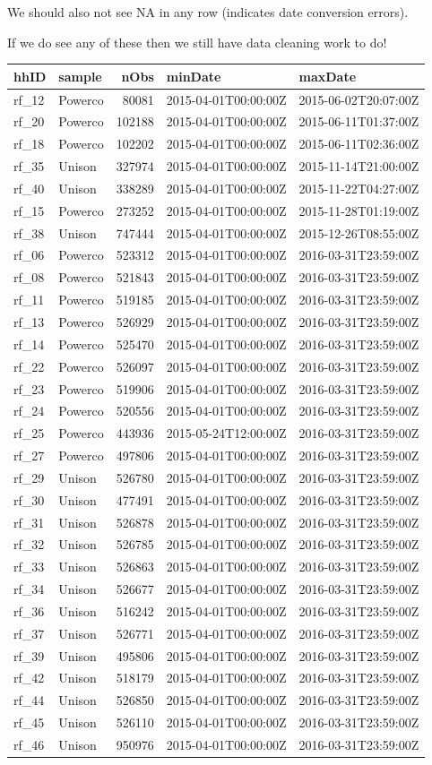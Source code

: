\documentclass[]{article}
\begin{document}
We should also not see NA in any row (indicates date conversion errors).

If we do see any of these then we still have data cleaning work to do!

\begin{longtable}[]{@{}llrll@{}}
\toprule
hhID & sample & nObs & minDate & maxDate\tabularnewline
\midrule
\endhead
rf\_12 & Powerco & 80081 & 2015-04-01T00:00:00Z &
2015-06-02T20:07:00Z\tabularnewline
rf\_20 & Powerco & 102188 & 2015-04-01T00:00:00Z &
2015-06-11T01:37:00Z\tabularnewline
rf\_18 & Powerco & 102202 & 2015-04-01T00:00:00Z &
2015-06-11T02:36:00Z\tabularnewline
rf\_35 & Unison & 327974 & 2015-04-01T00:00:00Z &
2015-11-14T21:00:00Z\tabularnewline
rf\_40 & Unison & 338289 & 2015-04-01T00:00:00Z &
2015-11-22T04:27:00Z\tabularnewline
rf\_15 & Powerco & 273252 & 2015-04-01T00:00:00Z &
2015-11-28T01:19:00Z\tabularnewline
rf\_38 & Unison & 747444 & 2015-04-01T00:00:00Z &
2015-12-26T08:55:00Z\tabularnewline
rf\_06 & Powerco & 523312 & 2015-04-01T00:00:00Z &
2016-03-31T23:59:00Z\tabularnewline
rf\_08 & Powerco & 521843 & 2015-04-01T00:00:00Z &
2016-03-31T23:59:00Z\tabularnewline
rf\_11 & Powerco & 519185 & 2015-04-01T00:00:00Z &
2016-03-31T23:59:00Z\tabularnewline
rf\_13 & Powerco & 526929 & 2015-04-01T00:00:00Z &
2016-03-31T23:59:00Z\tabularnewline
rf\_14 & Powerco & 525470 & 2015-04-01T00:00:00Z &
2016-03-31T23:59:00Z\tabularnewline
rf\_22 & Powerco & 526097 & 2015-04-01T00:00:00Z &
2016-03-31T23:59:00Z\tabularnewline
rf\_23 & Powerco & 519906 & 2015-04-01T00:00:00Z &
2016-03-31T23:59:00Z\tabularnewline
rf\_24 & Powerco & 520556 & 2015-04-01T00:00:00Z &
2016-03-31T23:59:00Z\tabularnewline
rf\_25 & Powerco & 443936 & 2015-05-24T12:00:00Z &
2016-03-31T23:59:00Z\tabularnewline
rf\_27 & Powerco & 497806 & 2015-04-01T00:00:00Z &
2016-03-31T23:59:00Z\tabularnewline
rf\_29 & Unison & 526780 & 2015-04-01T00:00:00Z &
2016-03-31T23:59:00Z\tabularnewline
rf\_30 & Unison & 477491 & 2015-04-01T00:00:00Z &
2016-03-31T23:59:00Z\tabularnewline
rf\_31 & Unison & 526878 & 2015-04-01T00:00:00Z &
2016-03-31T23:59:00Z\tabularnewline
rf\_32 & Unison & 526785 & 2015-04-01T00:00:00Z &
2016-03-31T23:59:00Z\tabularnewline
rf\_33 & Unison & 526863 & 2015-04-01T00:00:00Z &
2016-03-31T23:59:00Z\tabularnewline
rf\_34 & Unison & 526677 & 2015-04-01T00:00:00Z &
2016-03-31T23:59:00Z\tabularnewline
rf\_36 & Unison & 516242 & 2015-04-01T00:00:00Z &
2016-03-31T23:59:00Z\tabularnewline
rf\_37 & Unison & 526771 & 2015-04-01T00:00:00Z &
2016-03-31T23:59:00Z\tabularnewline
rf\_39 & Unison & 495806 & 2015-04-01T00:00:00Z &
2016-03-31T23:59:00Z\tabularnewline
rf\_42 & Unison & 518179 & 2015-04-01T00:00:00Z &
2016-03-31T23:59:00Z\tabularnewline
rf\_44 & Unison & 526850 & 2015-04-01T00:00:00Z &
2016-03-31T23:59:00Z\tabularnewline
rf\_45 & Unison & 526110 & 2015-04-01T00:00:00Z &
2016-03-31T23:59:00Z\tabularnewline
rf\_46 & Unison & 950976 & 2015-04-01T00:00:00Z &
2016-03-31T23:59:00Z\tabularnewline
\bottomrule
\end{longtable}
\end{document}
